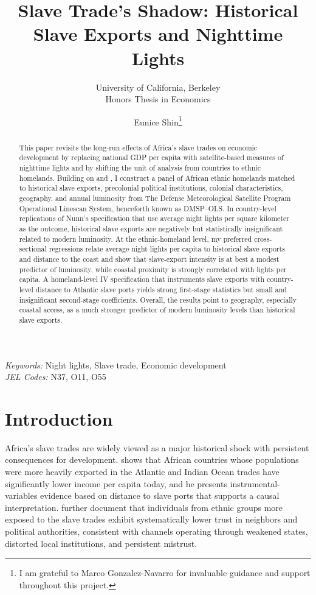 \documentclass[12pt]{article}
\title{Slave Trade’s Shadow: Historical Slave Exports and Nighttime Lights}
\subtitle{University of California, Berkeley\\Honors Thesis in Economics}
\author{Eunice Shin\thanks{I am grateful to Marco Gonzalez-Navarro for invaluable guidance and support throughout this project.}}
\begin{document}
\maketitle

\begin{abstract}
This paper revisits the long-run effects of Africa's slave trades on economic development by replacing national GDP per capita with satellite-based measures of nighttime lights and by shifting the unit of analysis from countries to ethnic homelands. Building on \citet{nunn2008} and \citet{henderson2012}, I construct a panel of African ethnic homelands matched to historical slave exports, precolonial political institutions, colonial characteristics, geography, and annual luminosity from The Defense Meteorological Satellite Program Operational Linescan System, henceforth known as DMSP--OLS. In country-level replications of Nunn's specification that use average night lights per square kilometer as the outcome, historical slave exports are negatively but statistically insignificant related to modern luminosity. At the ethnic-homeland level, my preferred cross-sectional regressions relate average night lights per capita to historical slave exports and distance to the coast and show that slave-export intensity is at best a modest predictor of luminosity, while coastal proximity is strongly correlated with lights per capita. A homeland-level IV specification that instruments slave exports with country-level distance to Atlantic slave ports yields strong first-stage statistics but small and insignificant second-stage coefficients. Overall, the results point to geography, especially coastal access, as a much stronger predictor of modern luminosity levels than historical slave exports.
\end{abstract}

\doublespacing
\textit{Keywords:} Night lights, Slave trade, Economic development\\
\textit{JEL Codes:} N37, O11, O55

\newpage
{}

\section{Introduction}

Africa's slave trades are widely viewed as a major historical shock with persistent consequences for development. \citet{nunn2008} shows that African countries whose populations were more heavily exported in the Atlantic and Indian Ocean trades have significantly lower income per capita today, and he presents instrumental-variables evidence based on distance to slave ports that supports a causal interpretation. \citet{nunnwantchekon2011} further document that individuals from ethnic groups more exposed to the slave trades exhibit systematically lower trust in neighbors and political authorities, consistent with channels operating through weakened states, distorted local institutions, and persistent mistrust.
\end{document}
